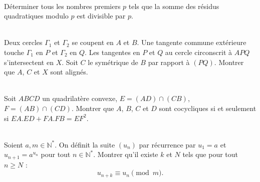\begin{exo}\\
Déterminer tous les nombres premiers $p$ tels que la somme des résidus quadratiques modulo $p$ est divisible par $p$.
\end{exo}

\bigskip

\begin{exo}\\
Deux cercles $\Gamma_1$ et $\Gamma_2$ se coupent en $A$ et $B$. Une tangente commune extérieure touche $\Gamma_1$ en $P$ et $\Gamma_2$ en $Q$. Les tangentes en $P$ et $Q$ au cercle circonscrit à $APQ$ s'intersectent en $X$. Soit $C$ le symétrique de $B$ par rapport à $(PQ)$. Montrer que $A$, $C$ et $X$ sont alignés.
\end{exo}

\bigskip

\begin{exo}\\
Soit $ABCD$ un quadrilat\`ere convexe, $E=(AD)\cap (CB)$, $F=(AB)\cap (CD)$. Montrer que
$A$, $B$, $C$ et $D$ sont cocycliques si et seulement si $EA.ED+FA.FB=EF^2$.
\end{exo}


\bigskip

\begin{exo}\\
Soient $a,m \in \mathbb{N}^*$. On définit la suite $(u_n)$ par récurrence par $u_1=a$ et $u_{n+1}=a^{u_n}$ pour tout $n \in \mathbb{N}^*$. Montrer qu'il existe $k$ et $N$ tels que pour tout $n \geq N$ :
\[u_{n+k} \equiv u_n \pmod{m}.\]
\end{exo}


